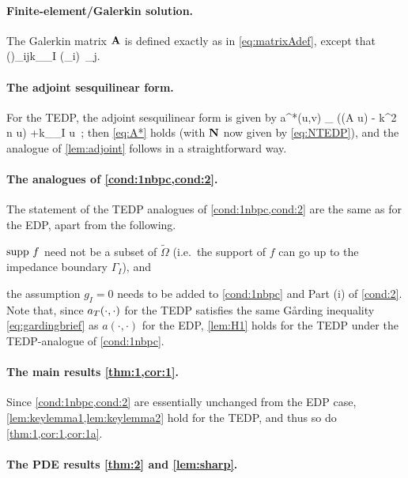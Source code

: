 \paragraph{Finite-element/Galerkin solution.}
The Galerkin matrix $\mathbf{A}$ is defined exactly as in \cref{eq:matrixAdef}, except that 
\beq\label{eq:NTEDP}
\big(\Nmat\big)_{ij}\de \ri k\int_{\Gamma_I}  (\gamma\phi_i) \,\gamma \phi_j.
\eeq

\paragraph{The adjoint sesquilinear form.} For the TEDP, the adjoint sesquilinear form is given by 
\beq\label{eq:TEDPadjoint}
a^*(u,v) \de \int_{\DR} 
\Big((A \grad u)\cdot\grad \vb
 - k^2 n u\vb\Big) +\ri k\int_{\Gamma_I} \gamma u\, ;
\eeq
then \cref{eq:A*} holds (with $\mathbf{N}$ now given by \cref{eq:NTEDP}), and the analogue of \cref{lem:adjoint} follows in a straightforward way.


\paragraph{The analogues of \cref{cond:1nbpc,cond:2}.}
The statement of the TEDP analogues of \cref{cond:1nbpc,cond:2} are the same as for the EDP, apart from the following.
\ben
\item
$\operatorname{supp} \,f$ need not be a subset of $\widetilde{\Omega}$ (i.e.~the support of $f$ can go up to the impedance boundary $\Gamma_I$), and
\item the assumption $g_I= 0$ needs to be added to \cref{cond:1nbpc} and Part (i) of \cref{cond:2}.
\een
 Note that, since $a_{T}(\cdot,\cdot)$ for the TEDP satisfies the same G\aa rding inequality \cref{eq:gardingbrief} as $a(\cdot,\cdot)$ for the EDP, \cref{lem:H1} holds for the TEDP under the TEDP-analogue of \cref{cond:1nbpc}.

\paragraph{The main results \cref{thm:1,cor:1}.}
Since \cref{cond:1nbpc,cond:2} are essentially unchanged from the EDP case, \cref{lem:keylemma1,lem:keylemma2} hold for the TEDP, and thus so do \cref{thm:1,cor:1,cor:1a}.

\paragraph{The PDE results \cref{thm:2} and \cref{lem:sharp}.}

